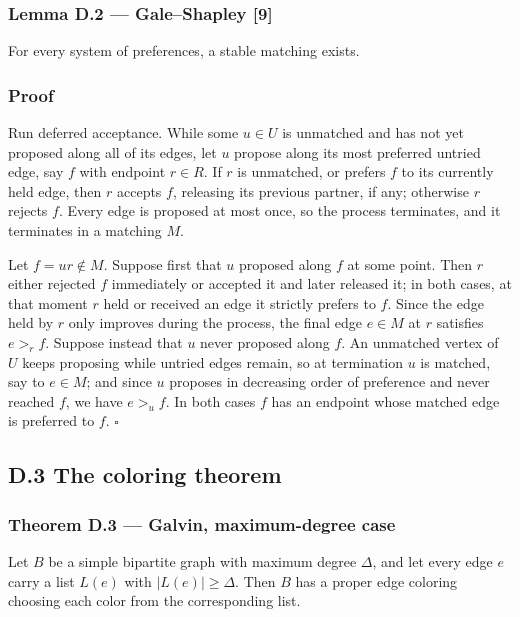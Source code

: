 \documentclass[
  american,
  11pt,
  a4paper,
]{article}
\begin{document}
\subsubsection{Lemma D.2 --- Gale--Shapley {[}9{]}}\label{lemma-d.2-galeshapley-9}

For every system of preferences, a stable matching exists.

\subsubsection{Proof}\label{proof-10}

Run deferred acceptance. While some \(u\in U\) is unmatched and has not yet proposed along all of its edges, let \(u\) propose along its most preferred untried edge, say \(f\) with endpoint \(r\in R\). If \(r\) is unmatched, or prefers \(f\) to its currently held edge, then \(r\) accepts \(f\), releasing its previous partner, if any; otherwise \(r\) rejects \(f\). Every edge is proposed at most once, so the process terminates, and it terminates in a matching \(M\).

Let \(f=ur\notin M\). Suppose first that \(u\) proposed along \(f\) at some point. Then \(r\) either rejected \(f\) immediately or accepted it and later released it; in both cases, at that moment \(r\) held or received an edge it strictly prefers to \(f\). Since the edge held by \(r\) only improves during the process, the final edge \(e\in M\) at \(r\) satisfies \(e>_rf\). Suppose instead that \(u\) never proposed along \(f\). An unmatched vertex of \(U\) keeps proposing while untried edges remain, so at termination \(u\) is matched, say to \(e\in M\); and since \(u\) proposes in decreasing order of preference and never reached \(f\), we have \(e>_uf\). In both cases \(f\) has an endpoint whose matched edge is preferred to \(f\). \(\square\)

\subsection{D.3 The coloring theorem}\label{d.3-the-coloring-theorem}

\subsubsection{Theorem D.3 --- Galvin, maximum-degree case}\label{theorem-d.3-galvin-maximum-degree-case}

Let \(B\) be a simple bipartite graph with maximum degree \(\Delta\), and let every edge \(e\) carry a list \(L(e)\) with \(|L(e)|\ge\Delta\). Then \(B\) has a proper edge coloring choosing each color from the corresponding list.
\end{document}
